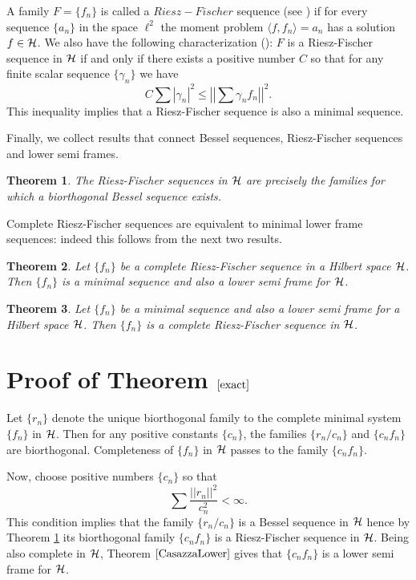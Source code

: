 \documentclass[11pt, a4paper]{article}
\newtheorem{theorem}{Theorem}[section]
\begin{document}
A family $F=\{f_n\}$ is called a $Riesz-Fischer$ sequence (see \cite[Chapter 4, Section 2]{Young})
if for every sequence $\{a_n\}$ in the space $\ell^2$ the moment problem $\langle f, f_n\rangle =a_n$
has a solution $f\in\cal{H}$. We also have the following characterization 
(\cite[Chapter 4, Section 2, Theorem 3]{Young}): 
$F$ is a Riesz-Fischer sequence in $\cal H$ if and only if
there exists a positive number $C$ so that for any finite scalar sequence $\{\gamma_n\}$ we have
\[
C\sum |\gamma_n|^2   \le \left|\left|\sum \gamma_n f_n \right|\right|^2.
\]
This inequality implies that a Riesz-Fischer sequence is also a minimal sequence.


Finally, we collect results that connect Bessel sequences, Riesz-Fischer sequences and lower semi frames. 
\begin{theorem}\label{Casazza} \cite[Proposition 2.3, (ii)]{Casazza}\label{Cas1}
The Riesz-Fischer sequences in $\cal{H}$ are precisely the families for which a biorthogonal Bessel sequence exists.
\end{theorem}
Complete Riesz-Fischer sequences are equivalent to minimal lower frame sequences: indeed
this follows from the next two results.
\begin{theorem}\label{CasazzaLower}\cite[Theorem 3.2]{Casazza}
Let $\{f_n\}$ be a complete Riesz-Fischer sequence in a Hilbert space $\cal{H}$.
Then $\{f_n\}$ is a minimal sequence and also a lower semi frame for $\cal{H}$.
\end{theorem}
\begin{theorem}\cite[Corollary 6.20]{BalazsShamsabadi}
Let $\{f_n\}$ be a minimal sequence and also a lower semi frame for a Hilbert space $\cal{H}$. Then
$\{f_n\}$ is a complete Riesz-Fischer sequence in $\cal{H}$.
\end{theorem}




\section{Proof of Theorem $\ref{exact}$}
\setcounter{equation}{0}

Let $\{r_n\}$ denote the unique biorthogonal family to the complete minimal system $\{f_n\}$ in $\cal H$. 
Then for any positive constants $\{c_n\}$, the families $\{r_n/c_n\}$ and $\{c_n f_n\}$ are biorthogonal. 
Completeness of $\{f_n\}$  in $\cal H$ passes to the family $\{c_n f_n\}$.


Now, choose positive numbers $\{c_{n}\}$ so that
\[
\sum \frac{||r_{n}||^2}{c^2_{n}}<\infty.
\]
This condition implies that the family $\{r_n/c_n\}$ is a Bessel sequence in $\cal H$ hence by
Theorem \ref{Casazza} its biorthogonal family $\{c_n f_n\}$ is a Riesz-Fischer sequence in $\cal H$. Being also complete in $\cal H$,
Theorem $\ref{CasazzaLower}$ gives that $\{c_n f_n\}$ is a lower semi frame for $\cal H$.
\end{document}
